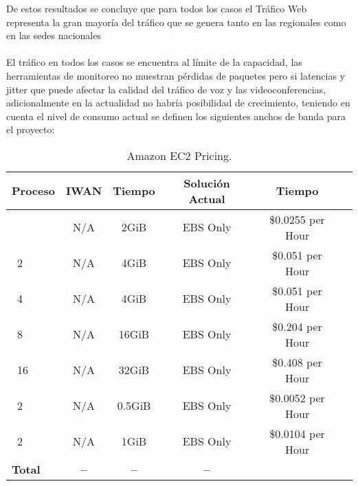 De estos resultados se concluye que para todos los casos el Tráfico Web representa la gran mayoría del tráfico que se genera tanto en las regionales como en las sedes nacionales
\\
\\
El tráfico en todos los casos se encuentra al límite de la capacidad, las herramientas de monitoreo no muestran pérdidas de paquetes pero si latencias y jitter que puede afectar la calidad del tráfico de voz y las videoconferencias, adicionalmente en la actualidad no habría posibilidad de crecimiento, teniendo en cuenta el nivel de consumo actual se definen los siguientes anchos de banda para el proyecto:

\begin{table}[ht]
	\caption{Amazon EC2 Pricing.}
	\label{tab:hla:results}
\centering
\begin{tabular}{lccccc}
	\toprule
	\multicolumn{1}{c}{\textbf{Proceso}} 	& \textbf{IWAN}	& \textbf{Tiempo}	& \textbf{Solución Actual}
	& \textbf{Tiempo}\\
	\midrule
\cite{Aprovisionamiento tienda nueva} 		& N/A & 2GiB & EBS Only	& \$0.0255 per Hour \\
\cite{a1.large}~2 		& N/A & 4GiB & EBS Only & \$0.051 per Hour	\\
\cite{a1.xlarge}~4		& N/A & 4GiB & EBS Only & \$0.051 per Hour	\\
\cite{a1.2xlarge}~8 	& N/A & 16GiB & EBS Only & \$0.204 per Hour	\\
\cite{a1.4xlarge}~16	& N/A & 32GiB & EBS Only & \$0.408 per Hour	\\
\cite{t3.nano}~2		& N/A & 0.5GiB & EBS Only & \$0.0052 per Hour	\\
\cite{t3.micro}~2   	& N/A & 1GiB & EBS Only & \$0.0104 per Hour	\\
	\midrule
	\textbf{Total}			& \textbf{--}		& \textbf{--}		& \textbf{--} \\
	\bottomrule
\end{tabular}
\end{table}